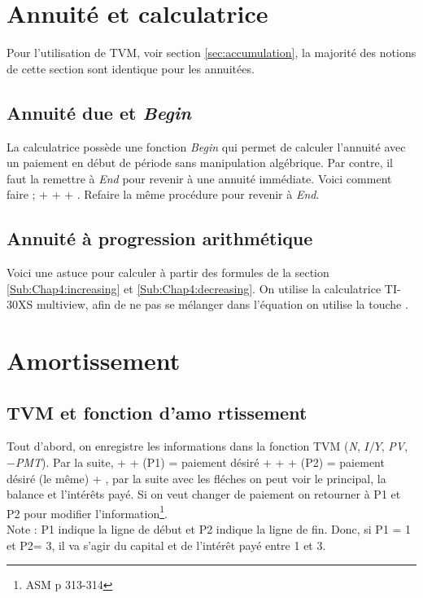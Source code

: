 \documentclass[11pt,french]{report}
\begin{document}
\chapter{Annuité et calculatrice}
\label{Annuité et calculatrice}

Pour l'utilisation de TVM, voir section \ref{sec:accumulation}, la majorité des notions de cette section sont identique pour les annuitées.

\section{Annuité due et \textit{Begin}}
\label{Begin}

La calculatrice possède une fonction \textit{Begin} qui permet de calculer l'annuité avec un paiement en début de période sans manipulation algébrique. Par contre, il faut la remettre à \textit{End} pour revenir à une annuité immédiate. Voici comment faire ;
 +  +  + .
Refaire la même procédure pour revenir à \textit{End}.

\section{Annuité à progression arithmétique}
\label{annuité et TI-30XS}
Voici une astuce pour calculer à partir des formules de la section \ref{Sub:Chap4:increasing} et \ref{Sub:Chap4:decreasing}. On utilise la calculatrice TI-30XS multiview, afin de ne pas se mélanger dans l'équation on utilise la touche .

\chapter{Amortissement}
\label{Amortissement}

\section{TVM et fonction d'amo
rtissement}
\label{ann:chap:amortissement}
Tout d'abord, on enregistre les informations dans la fonction TVM (\textit{N}, \textit{$I/Y$}, \textit{PV}, \textit{$-$PMT}). Par la suite,  +  + (P1) = paiement désiré +  + \fbox{$\downarrow$} + (P2) = paiement désiré (le même) + , par la suite avec les fléches on peut voir le principal, la balance et l'intérêts payé. Si on veut changer de paiement on retourner à P1 et P2 pour modifier l'information\footnote{ASM p 313-314}. 
\\Note : P1 indique la ligne de début et P2 indique la ligne de fin. Donc, si P1 = 1 et P2= 3, il va s'agir du capital et de l'intérêt payé entre 1 et 3.
\end{document}
